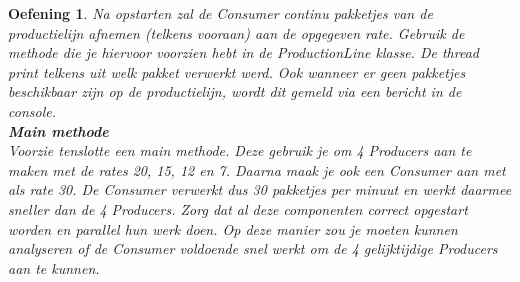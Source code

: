 \documentclass{tstextbook}
\newtheorem{envoefening}{Oefening}[chapter]
\newenvironment{oefening}
               {\begin{boxexercise}\begin{envoefening}}
               {\end{envoefening}\end{boxexercise}}
\begin{document}
\begin{oefening}
Na opstarten zal de Consumer continu pakketjes van de productielijn afnemen (telkens vooraan) aan de opgegeven rate. Gebruik de methode die je hiervoor voorzien hebt in de ProductionLine klasse. 
De thread print telkens uit welk pakket verwerkt werd. Ook wanneer er geen pakketjes beschikbaar zijn op de productielijn, wordt dit gemeld via een bericht in de console.
\\
\textbf{Main methode}\\
Voorzie tenslotte een main methode. Deze gebruik je om 4 Producers aan te maken met de rates 20, 15, 12 en 7. Daarna maak je ook een Consumer aan met als rate 30. De Consumer verwerkt dus 30 pakketjes per minuut en werkt daarmee sneller dan de 4 Producers. 
Zorg dat al deze componenten correct opgestart worden en parallel hun werk doen. Op deze manier zou je moeten kunnen analyseren of de Consumer voldoende snel werkt om de 4 gelijktijdige Producers aan te kunnen.
\end{oefening}


%
%


\printindex
\end{document}
